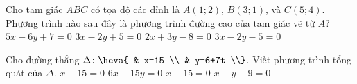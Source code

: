 \begin{ex}%
	Cho tam giác $ABC$ có tọa độ các đỉnh là $A\left(1;2\right)$, $B\left(3;1\right)$, và $C\left(5;4\right)$. Phương trình nào sau đây là phương trình đường cao của tam giác vẽ từ $A$?
	\choice
	{$5x-6y+7=0$}
	{$3x-2y+5=0$}
	{\True $2x+3y-8=0$}
	{$3x-2y-5=0$}
\end{ex}
\begin{ex}%
	Cho đường thẳng $\Delta \colon \heva{
		& x=15 \\ 
		& y=6+7t \\}$. Viết phương trình tổng quát của $\Delta $.
	\choice
	{$x+15=0$}
	{$6x-15y=0$}
	{\True $x-15=0$}
	{$x-y-9=0$}
\end{ex}
